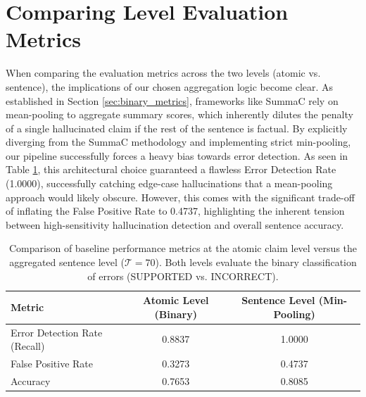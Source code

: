 \section{Comparing Level Evaluation Metrics}
When comparing the evaluation metrics across the two levels (atomic vs. sentence), the implications of our chosen aggregation logic become clear. As established in Section \ref{sec:binary_metrics}, frameworks like SummaC \cite{laban2021summaC} rely on mean-pooling to aggregate summary scores, which inherently dilutes the penalty of a single hallucinated claim if the rest of the sentence is factual. By explicitly diverging from the SummaC methodology and implementing strict min-pooling, our pipeline successfully forces a heavy bias towards error detection. As seen in Table \ref{tab:min_pooling_comparison}, this architectural choice guaranteed a flawless Error Detection Rate (1.0000), successfully catching edge-case hallucinations that a mean-pooling approach would likely obscure. However, this comes with the significant trade-off of inflating the False Positive Rate to 0.4737, highlighting the inherent tension between high-sensitivity hallucination detection and overall sentence accuracy.

\begin{table}[htbp]
    \centering
    \caption{Comparison of baseline performance metrics at the atomic claim level versus the aggregated sentence level ($\mathcal{T} = 70$). Both levels evaluate the binary classification of errors (SUPPORTED vs. INCORRECT).}
    \label{tab:min_pooling_comparison}
    \renewcommand{\arraystretch}{1.2}
    \begin{tabular}{l c c}
        \toprule
        \textbf{Metric} & \textbf{Atomic Level (Binary)} & \textbf{Sentence Level (Min-Pooling)} \\
        \midrule
        Error Detection Rate (Recall) & 0.8837 & 1.0000 \\
        False Positive Rate & 0.3273 & 0.4737 \\
        Accuracy & 0.7653 & 0.8085 \\
        \bottomrule
    \end{tabular}
\end{table}

